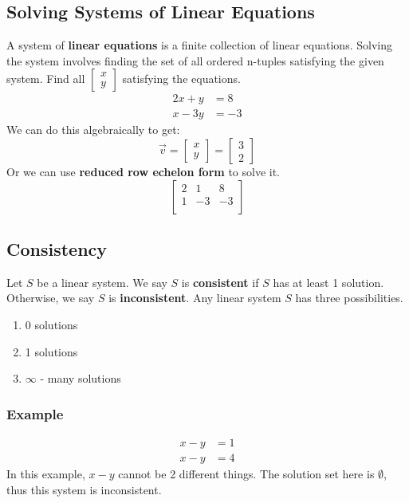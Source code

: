 \documentclass[letterpaper, 12pt]{math}
\begin{document}
\subsection*{Solving Systems of Linear Equations}
A system of \textbf{linear equations} is a finite collection of linear
equations. Solving the system involves finding the set of all ordered n-tuples
satisfying the given system. Find all \( \begin{bmatrix}x \\ y\end{bmatrix} \)
satisfying the equations.
\begin{align*}
  2x+y &= 8 \\
  x-3y &= -3
\end{align*}
We can do this algebraically to get:
\[ \vec{v} = \begin{bmatrix}x \\ y\end{bmatrix} = \begin{bmatrix} 3 \\ 2
  \end{bmatrix} \]
Or we can use \textbf{reduced row echelon form} to solve it.
\[ \left[\begin{array}{cc|c}
  2 & 1 & 8 \\
  1 & -3 & -3 \\
\end{array}\right] \]

\subsection*{Consistency}
Let \( S \) be a linear system. We say \( S \) is \textbf{consistent} if \( S \)
has at least 1 solution. Otherwise, we say \( S \) is \textbf{inconsistent}.
Any linear system \( S \) has three possibilities.
\begin{enumerate}
  \item 0 solutions
  \item 1 solutions
  \item \( \infty \) - many solutions
\end{enumerate}

\subsubsection*{Example}
\begin{align*}
  x-y &= 1 \\
  x-y &= 4
\end{align*}
In this example, \( x-y \) cannot be 2 different things. The solution set here
is \( \emptyset \), thus this system is inconsistent.
\end{document}
